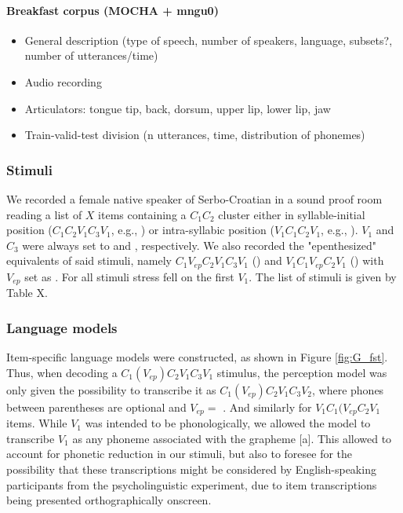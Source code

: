 \paragraph{Breakfast corpus (MOCHA + mngu0)}
{\color{red}
\begin{itemize}
\item General description (type of speech, number of speakers, language, subsets?, number of utterances/time)
\item Audio recording
\item Articulators: tongue {tip, back, dorsum}, upper lip, lower lip, jaw
\item Train-valid-test division (n utterances, time, distribution of phonemes)
\end{itemize}}


\subsubsection{Stimuli}
We recorded a female native speaker of Serbo-Croatian in a sound proof room reading a list of {\color{red}$X$} items containing a $C_{1}C_{2}$ cluster either in syllable-initial position ($C_{1}C_{2}V_{1}C_{3}V_{1}$, e.g., ) or intra-syllabic position ($V_{1}C_{1}C_{2}V_{1}$, e.g., ). $V_{1}$ and $C_{3}$ were always set to  and , respectively. 
We also recorded the "epenthesized" equivalents of said stimuli, namely $C_{1}V_{ep}C_{2}V_{1}C_{3}V_{1}$ () and $V_{1}C_{1}V_{ep}C_{2}V_{1}$ () with $V_{ep}$ set as {\color{red}\textipa{[@]}}.
For all stimuli stress fell on the first $V_{1}$.
{\color{red}The list of stimuli is given by Table X.}

\subsubsection{Language models}
Item-specific language models were constructed, as shown in Figure \ref{fig:G_fst}. Thus, when decoding a $C_{1}(V_{ep})C_{2}V_{1}C_{3}V_{1}$ stimulus, the perception model was only given the possibility to transcribe it as $C_{1}(V_{ep})C_{2}V_{1}C_{3}V_{2}$, where phones between parentheses are optional and $V_{ep} = $ \textipa{[@]}. And similarly for $V_{1}C_{1}(V_{ep}C_{2}V_{1}$ items.
While $V_{1}$ was intended to be  phonologically, we allowed the model to transcribe $V_{1}$ as any phoneme associated with the grapheme [a]. This allowed to account for phonetic reduction in our stimuli, but also to foresee for the possibility that these transcriptions might be considered by English-speaking participants from the psycholinguistic experiment, due to item transcriptions being presented orthographically onscreen.

